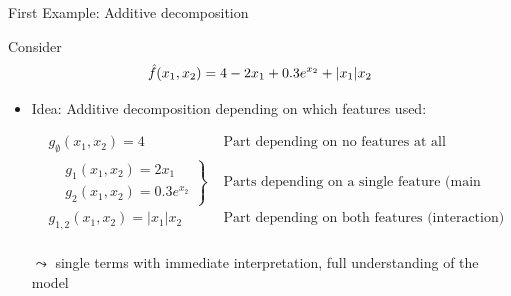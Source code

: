 \documentclass[10pt,compress,t,notes=noshow, xcolor=table]{beamer}
\begin{document}
\begin{frame}{First Example: Additive decomposition}

    \begin{example}

    Consider
    $$
    \hat{f}(x_1, x_2) = 4 - 2x_1 + 0.3 e^{x_2} + |x_1|x_2
    $$

    \begin{itemize}
    
        \item Idea: Additive decomposition depending on which features used:
        
        \pause
        \begin{equation}\label{eq:func_decomp_first_min_example}
        \begin{aligned}
            & g_\emptyset(x_1, x_2) = 4 & \text{ Part depending on no features at all (intercept)}  \\
            &
            \left.\begin{aligned}
                & g_1(x_1, x_2) = 2x_1 \\
                & g_2(x_1, x_2) = 0.3 e^{x_2}
            \end{aligned}\right\}
                & \text{ Parts depending on a single feature (main effects)}  \\
            & g_{1,2}(x_1, x_2) = |x_1|x_2 & \text{ Part depending on both features (interaction)}  \\
        \end{aligned}
        \end{equation}
        \item[$\leadsto$] single terms with immediate interpretation, full understanding of the model


\end{itemize}
\end{example}
\end{frame}
\end{document}
